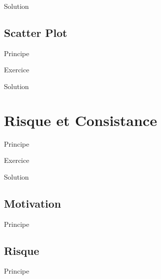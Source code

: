 \documentclass[11pt]{beamer}
\begin{document}
\begin{frame}{Solution}

\end{frame}

\subsection{Scatter Plot}

\begin{frame}{Principe}

\end{frame}

\begin{frame}{Exercice}

\end{frame}

\begin{frame}{Solution}

\end{frame}

\section{Risque et Consistance}

\begin{frame}{Principe}

\end{frame}

\begin{frame}{Exercice}

\end{frame}

\begin{frame}{Solution}

\end{frame}

\subsection{Motivation}

\begin{frame}{Principe}

\end{frame}

\subsection{Risque}

\begin{frame}{Principe}

\end{frame}
\end{document}
